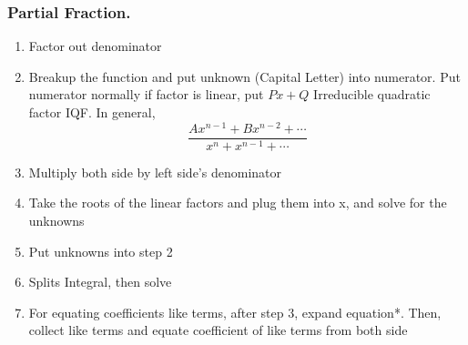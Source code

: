\documentclass[../../../main.tex]{subfiles}
\begin{document}
\subsubsection{Partial Fraction. }
\begin{enumerate}
    \item Factor out denominator
    \item Breakup the function and put unknown (Capital Letter) into numerator. Put numerator normally if factor is linear, put $Px+Q$ Irreducible quadratic factor IQF. In general, \begin{equation*}
        \frac{Ax^{n-1}+Bx^{n-2}+\cdots}{x^{n}+x^{n-1}+\cdots}
    \end{equation*}
    \item Multiply both side by left side's denominator
    \item Take the roots of the linear factors and plug them into x, and solve for the unknowns
    \item Put unknowns into step 2
    \item Splits Integral, then solve
    \item For equating coefficients like terms, after step 3, expand equation*. Then, collect like terms and equate coefficient of like terms from both side
\end{enumerate}
\end{document}

